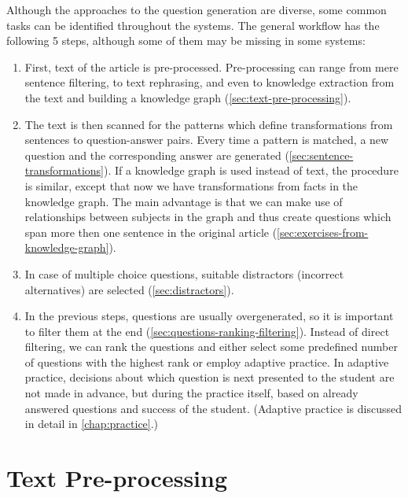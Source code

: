 \documentclass[12pt, twoside]{fithesis2}
\renewcommand{\_}{\leavevmode \kern0.07em\vbox{\hrule width0.4em}}
\newenvironment{myEnumerate}{
  \begin{enumerate}[leftmargin=2em,rightmargin=1em,itemsep=\parskip ,parsep=0em,topsep=0em,partopsep=0em]
}{
  \end{enumerate}
}
\newcounter{choice}
\begin{document}
Although the approaches to the question generation are diverse,
some common tasks can be identified throughout the systems.
The general workflow has the following 5 steps, although some of them may be missing in some systems:
\begin{myEnumerate}
\item First, text of the article is pre-processed.
Pre-processing can range from mere sentence filtering,
to text rephrasing, and even to knowledge extraction from the text and building a knowledge graph
(\autoref{sec:text-pre-processing}).

\item The text is then scanned for the patterns which define transformations from sentences to question-answer pairs.
  Every time a pattern is matched, a new question and the corresponding answer are generated
  (\autoref{sec:sentence-transformations}).
  If a knowledge graph is used instead of text, the procedure is similar, except that now we have transformations from facts in the knowledge graph. The main advantage is that we can make use of relationships between subjects in the graph and thus create questions which span more then one sentence in the original article
  (\autoref{sec:exercises-from-knowledge-graph}).

\item In case of multiple choice questions, suitable distractors (incorrect alternatives) are selected
(\autoref{sec:distractors}).

\item In the previous steps, questions are usually overgenerated, so it is important to filter them at the end
  (\autoref{sec:questions-ranking-filtering}).
  Instead of direct filtering, we can rank the questions and either select some predefined number of questions with the highest rank
  or employ adaptive practice.
In adaptive practice, decisions about which question is next presented to the student
are not made in advance, but during the practice itself,
based on already answered questions and success of the student.
(Adaptive practice is discussed in detail in \autoref{chap:practice}.)
\end{myEnumerate}

\section{Text Pre-processing}
\label{sec:text-pre-processing}
\end{document}
